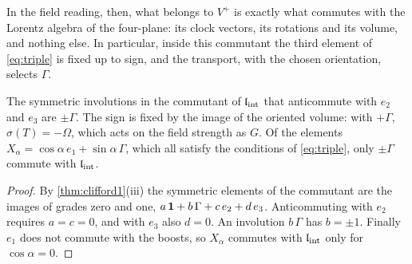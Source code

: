 In the field reading, then, what belongs to $V^+$ is exactly what commutes with the Lorentz algebra of the four-plane: its clock vectors,
its rotations and its volume, and nothing else. In particular, inside this commutant the third element of \cref{eq:triple} is fixed up to sign, and the transport, with the chosen
orientation, selects $\Gamma$.

\begin{proposition}
\label{prop:unique}
The symmetric involutions in the commutant of $\mathfrak l_{\rm int}$ that anticommute with $e_2$ and $e_3$ are $\pm\Gamma$. The sign is fixed by the image
of the oriented volume: with $+\Gamma$, $\sigma(T)=-\Omega$, which acts on the field strength as $G$. Of the elements
$X_\alpha=\cos\alpha\,e_1+\sin\alpha\,\Gamma$, which all satisfy the conditions of \cref{eq:triple}, only $\pm\Gamma$ commute with $\mathfrak l_{\rm int}$.
\end{proposition}

\begin{proof}
By \cref{thm:clifford1}(iii) the symmetric elements of the commutant are the images of grades zero and one, $a\,\mathbf 1+b\,\Gamma+c\,e_2+d\,e_3$.
Anticommuting with $e_2$ requires $a=c=0$, and with $e_3$ also $d=0$. An involution $b\,\Gamma$ has $b=\pm1$. Finally $e_1$ does not commute
with the boosts, so $X_\alpha$ commutes with $\mathfrak l_{\rm int}$ only for $\cos\alpha=0$.
\end{proof}


